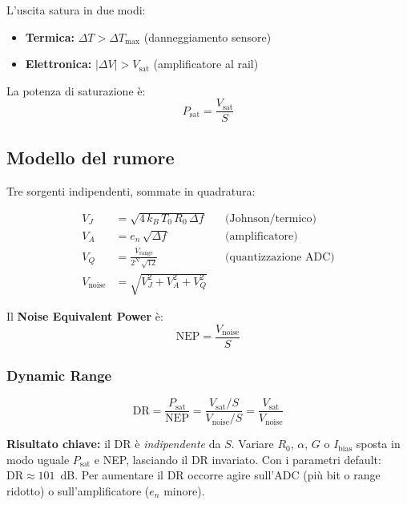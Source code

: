 \documentclass[11pt,a4paper]{article}
\begin{document}
L'uscita satura in due modi:
\begin{itemize}[noitemsep]
  \item \textbf{Termica:} $\Delta T > \Delta T_{\max}$ (danneggiamento sensore)
  \item \textbf{Elettronica:} $|\Delta V| > V_{\text{sat}}$ (amplificatore al rail)
\end{itemize}
La potenza di saturazione è:
\begin{equation}
  P_{\text{sat}} = \frac{V_{\text{sat}}}{S}
\end{equation}

\subsection{Modello del rumore}

Tre sorgenti indipendenti, sommate in quadratura:

\begin{align}
  V_J &= \sqrt{4\,k_B\,T_0\,R_0\,\Delta f}  && \text{(Johnson/termico)} \\
  V_A &= e_n\,\sqrt{\Delta f}               && \text{(amplificatore)} \\
  V_Q &= \frac{V_{\text{range}}}{2^N\,\sqrt{12}} && \text{(quantizzazione ADC)} \\[6pt]
  V_{\text{noise}} &= \sqrt{V_J^2 + V_A^2 + V_Q^2}
\end{align}

Il \textbf{Noise Equivalent Power} è:
\begin{equation}
  \text{NEP} = \frac{V_{\text{noise}}}{S}
\end{equation}

\subsubsection*{Dynamic Range}

\begin{equation}
  \text{DR} = \frac{P_{\text{sat}}}{\text{NEP}}
  = \frac{V_{\text{sat}}/S}{V_{\text{noise}}/S}
  = \frac{V_{\text{sat}}}{V_{\text{noise}}}
  \label{eq:DR}
\end{equation}

\begin{infobox}
\textbf{Risultato chiave:} il DR è \emph{indipendente} da $S$.
Variare $R_0$, $\alpha$, $G$ o $I_{\text{bias}}$ sposta in modo uguale
$P_{\text{sat}}$ e NEP, lasciando il DR invariato.
Con i parametri default: $\text{DR} \approx 101$~dB.
Per aumentare il DR occorre agire sull'ADC (più bit o range ridotto)
o sull'amplificatore ($e_n$ minore).
\end{infobox}
\end{document}
